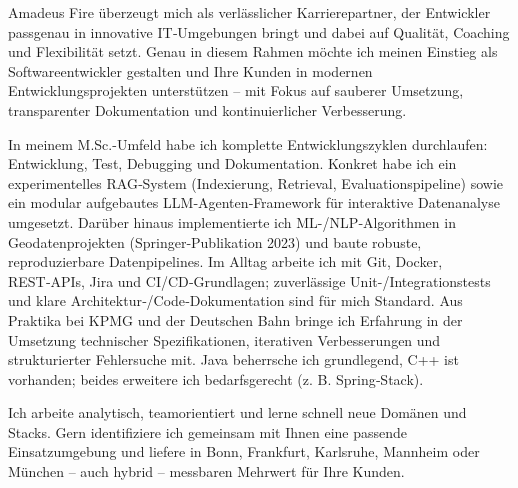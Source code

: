 Amadeus Fire überzeugt mich als verlässlicher Karrierepartner, der Entwickler passgenau in innovative IT‑Umgebungen bringt und dabei auf Qualität, Coaching und Flexibilität setzt. Genau in diesem Rahmen möchte ich meinen Einstieg als Softwareentwickler gestalten und Ihre Kunden in modernen Entwicklungsprojekten unterstützen – mit Fokus auf sauberer Umsetzung, transparenter Dokumentation und kontinuierlicher Verbesserung.

In meinem M.Sc.-Umfeld habe ich komplette Entwicklungszyklen durchlaufen: Entwicklung, Test, Debugging und Dokumentation. Konkret habe ich ein experimentelles RAG‑System (Indexierung, Retrieval, Evaluationspipeline) sowie ein modular aufgebautes LLM‑Agenten‑Framework für interaktive Datenanalyse umgesetzt. Darüber hinaus implementierte ich ML-/NLP‑Algorithmen in Geodatenprojekten (Springer‑Publikation 2023) und baute robuste, reproduzierbare Datenpipelines. Im Alltag arbeite ich mit Git, Docker, REST‑APIs, Jira und CI/CD‑Grundlagen; zuverlässige Unit-/Integrationstests und klare Architektur‑/Code‑Dokumentation sind für mich Standard. Aus Praktika bei KPMG und der Deutschen Bahn bringe ich Erfahrung in der Umsetzung technischer Spezifikationen, iterativen Verbesserungen und strukturierter Fehlersuche mit. Java beherrsche ich grundlegend, C++ ist vorhanden; beides erweitere ich bedarfsgerecht (z. B. Spring‑Stack).

Ich arbeite analytisch, teamorientiert und lerne schnell neue Domänen und Stacks. Gern identifiziere ich gemeinsam mit Ihnen eine passende Einsatzumgebung und liefere in Bonn, Frankfurt, Karlsruhe, Mannheim oder München – auch hybrid – messbaren Mehrwert für Ihre Kunden.